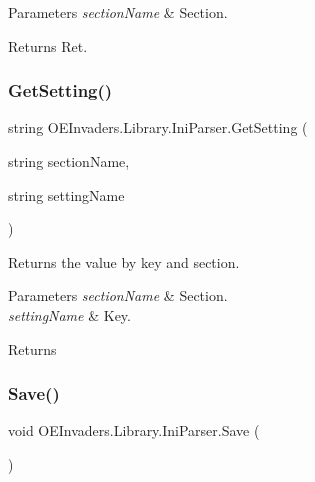 \begin{DoxyParams}{Parameters}
{\em section\+Name} & Section.\\
\hline
\end{DoxyParams}
\begin{DoxyReturn}{Returns}
Ret.
\end{DoxyReturn}
\mbox{\label{class_o_e_invaders_1_1_library_1_1_ini_parser_a3bd747ddffa89d0260d589ede0518b86}} 
\subsubsection{\texorpdfstring{GetSetting()}{GetSetting()}}
{\footnotesize\ttfamily string O\+E\+Invaders.\+Library.\+Ini\+Parser.\+Get\+Setting (\begin{DoxyParamCaption}\item[{string}]{section\+Name,  }\item[{string}]{setting\+Name }\end{DoxyParamCaption})}



Returns the value by key and section. 


\begin{DoxyParams}{Parameters}
{\em section\+Name} & Section.\\
\hline
{\em setting\+Name} & Key.\\
\hline
\end{DoxyParams}
\begin{DoxyReturn}{Returns}

\end{DoxyReturn}
\mbox{\label{class_o_e_invaders_1_1_library_1_1_ini_parser_abb76af2dd7efd7e4589709d2bc69ef95}} 
\subsubsection{\texorpdfstring{Save()}{Save()}}
{\footnotesize\ttfamily void O\+E\+Invaders.\+Library.\+Ini\+Parser.\+Save (\begin{DoxyParamCaption}{ }\end{DoxyParamCaption})}



